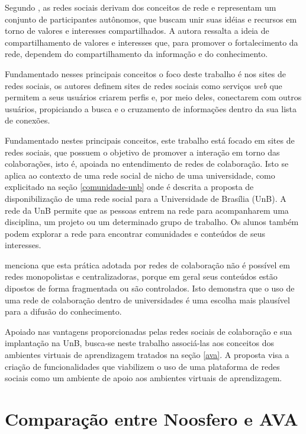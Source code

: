 Segundo \cite{marteleto2001analise}, as redes sociais derivam dos conceitos de rede e representam um conjunto de participantes autônomos, que buscam unir suas idéias e recursos em torno de valores e interesses compartilhados. A autora ressalta a ideia de compartilhamento de valores e interesses que, para promover o fortalecimento da rede, dependem do compartilhamento da informação e do conhecimento.

Fundamentado nesses principais conceitos o foco deste trabalho é nos sites de redes sociais, os autores  definem sites de redes sociais como serviços \textit{web} que permitem a seus usuários criarem perfis e, por meio deles, conectarem com outros usuários, propiciando a busca e o cruzamento de informações dentro da sua lista de conexões.

Fundamentado nestes principais conceitos, este trabalho está focado em sites de redes sociais, que possuem o objetivo de promover a interação em torno das colaborações, isto é, apoiada no entendimento de redes de colaboração. Isto se aplica ao contexto de uma rede social de nicho de uma universidade, como explicitado na seção \ref{comunidade-unb} onde é descrita a proposta de disponibilização de uma rede social para a Universidade de Brasília (UnB). A rede da UnB permite que as pessoas entrem na rede para acompanharem uma disciplina, um projeto ou um determinado grupo de trabalho. Os alunos também podem explorar a rede para encontrar comunidades e conteúdos de seus interesses.

 menciona que esta prática adotada por redes de colaboração não é possível em redes monopolistas e centralizadoras, porque em geral seus conteúdos estão dipostos de forma fragmentada ou são controlados. Isto demonstra que o uso de uma rede de colaboração dentro de universidades é uma escolha mais plausível para a difusão do conhecimento.

Apoiado nas vantagens proporcionadas pelas redes sociais de colaboração e sua implantação na UnB, busca-se neste trabalho associá-las aos conceitos dos ambientes virtuais de aprendizagem tratados na seção \ref{ava}. A proposta visa a criação de funcionalidades que viabilizem o uso de uma plataforma de redes sociais como um ambiente de apoio aos ambientes virtuais de aprendizagem.

\section{Comparação entre Noosfero e AVA}
\label{comparacao-ava}

